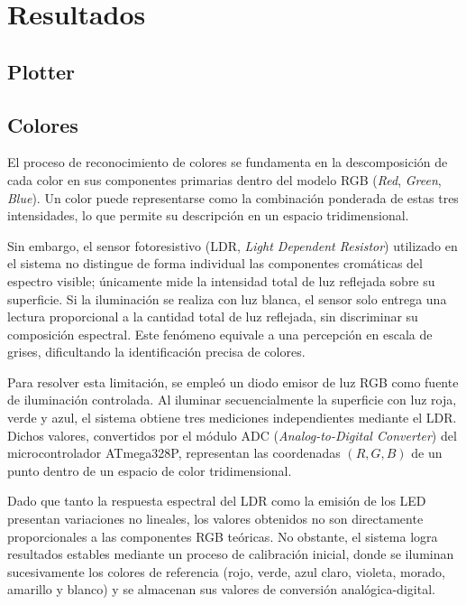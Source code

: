 \section{Resultados}
\subsection{Plotter}
\subsection{Colores}


El proceso de reconocimiento de colores se fundamenta en la descomposición de cada color en sus componentes primarias dentro del modelo RGB (\textit{Red}, \textit{Green}, \textit{Blue}). Un color puede representarse como la combinación ponderada de estas tres intensidades, lo que permite su descripción en un espacio tridimensional.  

\vspace{1em}

Sin embargo, el sensor fotoresistivo (LDR, \textit{Light Dependent Resistor}) utilizado en el sistema no distingue de forma individual las componentes cromáticas del espectro visible; únicamente mide la intensidad total de luz reflejada sobre su superficie. Si la iluminación se realiza con luz blanca, el sensor solo entrega una lectura proporcional a la cantidad total de luz reflejada, sin discriminar su composición espectral. Este fenómeno equivale a una percepción en escala de grises, dificultando la identificación precisa de colores.

\vspace{1em}

Para resolver esta limitación, se empleó un diodo emisor de luz RGB como fuente de iluminación controlada. Al iluminar secuencialmente la superficie con luz roja, verde y azul, el sistema obtiene tres mediciones independientes mediante el LDR. Dichos valores, convertidos por el módulo ADC (\textit{Analog-to-Digital Converter}) del microcontrolador ATmega328P, representan las coordenadas $(R, G, B)$ de un punto dentro de un espacio de color tridimensional.

\vspace{1em}

Dado que tanto la respuesta espectral del LDR como la emisión de los LED presentan variaciones no lineales, los valores obtenidos no son directamente proporcionales a las componentes RGB teóricas. No obstante, el sistema logra resultados estables mediante un proceso de calibración inicial, donde se iluminan sucesivamente los colores de referencia (rojo, verde, azul claro, violeta, morado, amarillo y blanco) y se almacenan sus valores de conversión analógica-digital.

